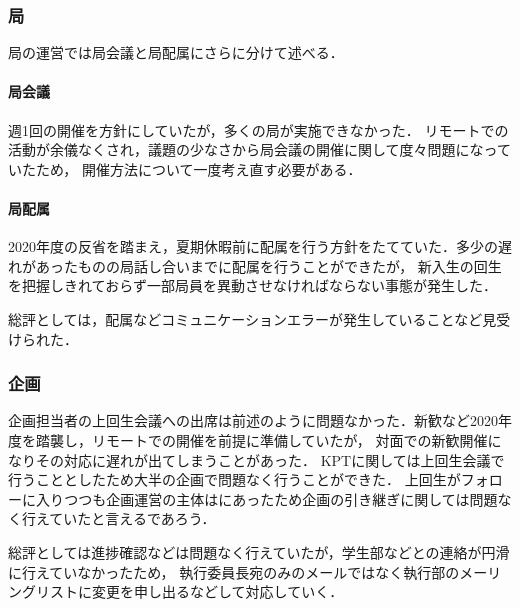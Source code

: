 \subsubsection*{局}
局の運営では局会議と局配属にさらに分けて述べる．
\paragraph*{局会議}
週1回の開催を方針にしていたが，多くの局が実施できなかった．
リモートでの活動が余儀なくされ，議題の少なさから局会議の開催に関して度々問題になっていたため，
開催方法について一度考え直す必要がある．
\paragraph*{局配属}
2020年度の反省を踏まえ，夏期休暇前に配属を行う方針をたてていた．多少の遅れがあったものの局話し合いまでに配属を行うことができたが，
新入生の回生を把握しきれておらず一部局員を異動させなければならない事態が発生した．

総評としては，配属などコミュニケーションエラーが発生していることなど見受けられた．

\subsubsection*{企画}
企画担当者の上回生会議への出席は前述のように問題なかった．新歓など2020年度を踏襲し，リモートでの開催を前提に準備していたが，
対面での新歓開催になりその対応に遅れが出てしまうことがあった．
KPTに関しては上回生会議で行うこととしたため大半の企画で問題なく行うことができた．
上回生がフォローに入りつつも企画運営の主体は\secondGrade{}にあったため企画の引き継ぎに関しては問題なく行えていたと言えるであろう．

総評としては進捗確認などは問題なく行えていたが，学生部などとの連絡が円滑に行えていなかったため，
執行委員長宛のみのメールではなく執行部のメーリングリストに変更を申し出るなどして対応していく．
